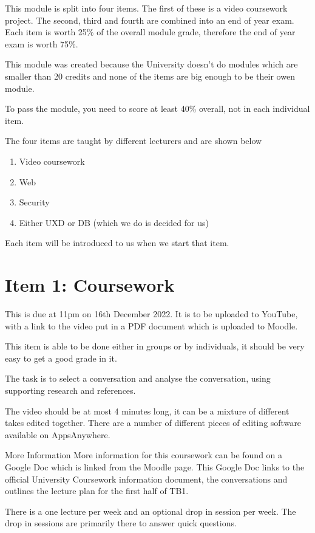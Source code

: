
This module is split into four items. The first of these is a video coursework project. The second, third and fourth are combined into an end of year exam. Each item is worth 25\% of the overall module grade, therefore the end of year exam is worth 75\%.

This module was created because the University doesn't do modules which are smaller than 20 credits and none of the items are big enough to be their owen module.

To pass the module, you need to score at least 40\% overall, not in each individual item.

The four items are taught by different lecturers and are shown below
\begin{enumerate}
    \item Video coursework
    \item Web
    \item Security
    \item Either UXD or DB (which we do is decided for us)
\end{enumerate}

Each item will be introduced to us when we start that item.

\section*{Item 1: Coursework}
This is due at 11pm on 16th December 2022. It is to be uploaded to YouTube, with a link to the video put in a PDF document which is uploaded to Moodle. 

This item is able to be done either in groups or by individuals, it should be very easy to get a good grade in it.

The task is to select a conversation and analyse the conversation, using supporting research and references. 

The video should be at most 4 minutes long, it can be a mixture of different takes edited together. There are a number of different pieces of editing software available on AppsAnywhere. 

\begin{link}{More Information}
More information for this coursework can be found on a Google Doc which is linked from the Moodle page. This Google Doc links to the official University Coursework information document, the conversations and outlines the lecture plan for the first half of TB1.
\end{link}

There is a one lecture per week and an optional drop in session per week. The drop in sessions are primarily there to answer quick questions.